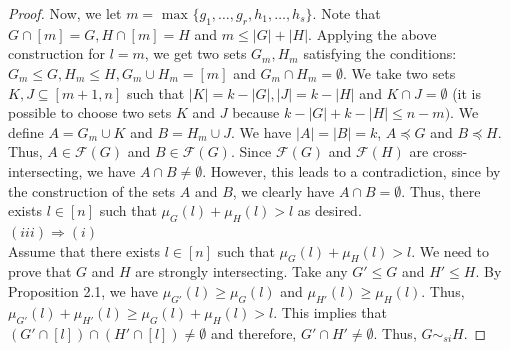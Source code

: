 \documentclass[10pt,a4paper]{amsart}
\begin{document}
\begin{proof}
Now, we let $m = \text{ max } \{g_{1},\ldots,g_{r}, h_{1},\ldots,h_{s}\}$. Note that $G \cap [m] =G, H \cap [m]=H$ and $m \leq |G|+|H|$. Applying the above construction for $l=m$, we get two sets $G_{m}, H_{m}$ satisfying the conditions: $G_{m} \leq G, H_{m} \leq H, G_{m} \cup H_{m}=[m]$ and $G_{m} \cap H_{m}=\emptyset$. We take two sets $K,J \subseteq[m+1,n]$ such that $|K|=k-|G|, |J|=k-|H|$ and $K \cap J=\emptyset$ (it is possible to choose two sets $K$ and $J$ because $k-|G|+k-|H| \leq n-m )$. We define $A=G_{m} \cup K$ and $B=H_{m} \cup J$. We have $|A|=|B|=k$, $A \preceq G$ and $B \preceq H$. Thus, $A \in \mathcal{F}(G)$ and $B \in \mathcal{F}(G)$. Since $\mathcal{F}(G)$ and $\mathcal{F}(H)$ are cross-intersecting, we have $A \cap B \neq \emptyset$.
However, this leads to a contradiction, since by the construction of the sets $A$ and $B$, we clearly have $A \cap B =\emptyset$. Thus, there exists $l \in [n]$ such that $\mu_{G}(l)+\mu_{H}(l) > l$ as desired.\\
$(iii) \Rightarrow (i)$\\
Assume that there exists $l \in [n]$ such that $\mu_{G}(l) +\mu_{H}(l) > l$. We need to prove that $G$ and $H$ are strongly intersecting. Take any $G' \leq G$ and $H' \leq H$. By Proposition 2.1, we have $\mu_{G'}(l) \geq \mu_{G}(l)$ and $\mu_{H'}(l) \geq \mu_{H}(l)$. Thus, $\mu_{G'}(l) +\mu_{H'}(l) \geq \mu_{G}(l) +\mu_{H}(l) > l$. This implies that $(G' \cap [l])\cap (H' \cap [l]) \neq \emptyset$ and therefore, $G' \cap H' \neq \emptyset$. Thus, $G \sim_{si} H$. 
\end{proof}
\end{document}
